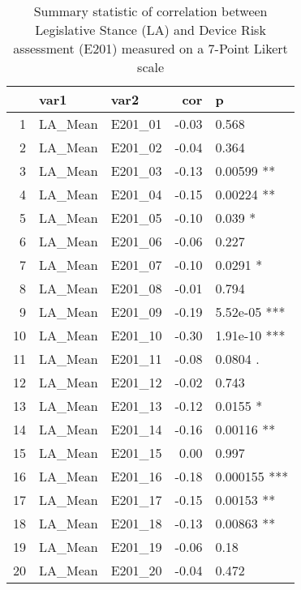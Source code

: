 \begin{table}[ht]
\centering
\begin{tabular}{rllrl}
  \hline
 & var1 & var2 & cor & p \\ 
  \hline
1 & LA\_Mean & E201\_01 & -0.03 & 0.568   \\ 
  2 & LA\_Mean & E201\_02 & -0.04 & 0.364   \\ 
  3 & LA\_Mean & E201\_03 & -0.13 & 0.00599 ** \\ 
  4 & LA\_Mean & E201\_04 & -0.15 & 0.00224 ** \\ 
  5 & LA\_Mean & E201\_05 & -0.10 & 0.039 * \\ 
  6 & LA\_Mean & E201\_06 & -0.06 & 0.227   \\ 
  7 & LA\_Mean & E201\_07 & -0.10 & 0.0291 * \\ 
  8 & LA\_Mean & E201\_08 & -0.01 & 0.794   \\ 
  9 & LA\_Mean & E201\_09 & -0.19 & 5.52e-05 *** \\ 
  10 & LA\_Mean & E201\_10 & -0.30 & 1.91e-10 *** \\ 
  11 & LA\_Mean & E201\_11 & -0.08 & 0.0804 . \\ 
  12 & LA\_Mean & E201\_12 & -0.02 & 0.743   \\ 
  13 & LA\_Mean & E201\_13 & -0.12 & 0.0155 * \\ 
  14 & LA\_Mean & E201\_14 & -0.16 & 0.00116 ** \\ 
  15 & LA\_Mean & E201\_15 & 0.00 & 0.997   \\ 
  16 & LA\_Mean & E201\_16 & -0.18 & 0.000155 *** \\ 
  17 & LA\_Mean & E201\_17 & -0.15 & 0.00153 ** \\ 
  18 & LA\_Mean & E201\_18 & -0.13 & 0.00863 ** \\ 
  19 & LA\_Mean & E201\_19 & -0.06 & 0.18   \\ 
  20 & LA\_Mean & E201\_20 & -0.04 & 0.472   \\ 
   \hline
\end{tabular}
\caption{Summary statistic of correlation between Legislative Stance (LA) and Device Risk assessment (E201) measured on a 7-Point Likert scale} 
\end{table}
